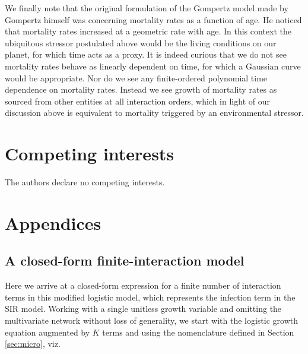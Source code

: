 \documentclass{article}
\begin{document}
We finally note that the original formulation of the Gompertz model made by Gompertz himself was concerning mortality rates as a function of age. He noticed that mortality rates increased at a geometric rate with age. In this context the ubiquitous stressor postulated above would be the living conditions on our planet, for which time acts as a proxy. It is indeed curious that we do not see mortality rates behave as linearly dependent on time, for which a Gaussian curve would be appropriate. Nor do we see any finite-ordered polynomial time dependence on mortality rates. Instead we see growth of mortality rates as sourced from other entities at all interaction orders, which in light of our discussion above is equivalent to mortality triggered by an environmental stressor.

\section*{Competing interests}
The authors declare no competing interests.

\appendix
\section*{Appendices}
\renewcommand{\thesubsection}{\Alph{subsection}}
\subsection{A closed-form finite-interaction model}
\label{appendix:a}
Here we arrive at a closed-form expression for a finite number of interaction terms in this modified logistic model, which represents the infection term in the SIR model. Working with a single unitless growth variable and omitting the multivariate network without loss of generality, we start with the logistic growth equation augmented by $K$ terms and using the nomenclature defined in Section \ref{sec:micro}, viz. 
\end{document}
